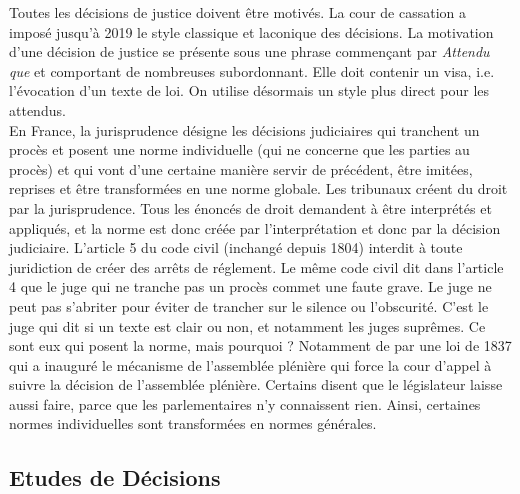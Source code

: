 \documentclass[math]{cours}
\begin{document}
	Toutes les décisions de justice doivent être motivés. La cour de cassation a imposé jusqu'à 2019 le style classique et laconique des décisions.
	La motivation d'une décision de justice se présente sous une phrase commençant par \textit{Attendu que} et comportant de nombreuses subordonnant.
	Elle doit contenir un visa, i.e. l'évocation d'un texte de loi.
	On utilise désormais un style plus direct pour les attendus. \\
	En France, la jurisprudence désigne les décisions judiciaires qui tranchent un procès et posent une norme individuelle (qui ne concerne que les parties au procès) et qui vont d'une certaine manière servir de précédent, être imitées, reprises et être transformées en une norme globale.
	Les tribunaux créent du droit par la jurisprudence.
	Tous les énoncés de droit demandent à être interprétés et appliqués, et la norme est donc créée par l'interprétation et donc par la décision judiciaire.
	L'article 5 du code civil (inchangé depuis 1804) interdit à toute juridiction de créer des arrêts de réglement.
	Le même code civil dit dans l'article 4 que le juge qui ne tranche pas un procès commet une faute grave.
	Le juge ne peut pas s'abriter pour éviter de trancher sur le silence ou l'obscurité.
	C'est le juge qui dit si un texte est clair ou non, et notamment les juges suprêmes. Ce sont eux qui posent la norme, mais pourquoi ?
	Notamment de par une loi de 1837 qui a inauguré le mécanisme de l'assemblée plénière qui force la cour d'appel à suivre la décision de l'assemblée plénière.
	Certains disent que le législateur laisse aussi faire, parce que les parlementaires n'y connaissent rien.
	Ainsi, certaines normes individuelles sont transformées en normes générales.

\subsection{Etudes de Décisions}
\end{document}
